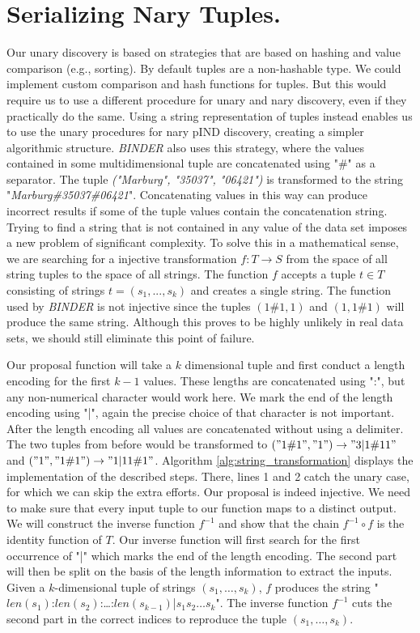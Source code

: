\section{Serializing Nary Tuples.}\label{subsec:nary-strings}
Our unary discovery is based on strategies that are based on hashing and value comparison (e.g., sorting). By default tuples are a non-hashable type. We could implement custom comparison and hash functions for tuples. But this would require us to use a different procedure for unary and nary discovery, even if they practically do the same. Using a string representation of tuples instead enables us to use the unary procedures for nary pIND discovery, creating a simpler algorithmic structure. \textit{BINDER} \cite{papenbrock2015divide} also uses this strategy, where the values contained in some multidimensional tuple are concatenated using "\#" as a separator. The tuple \textit{("Marburg", "35037", "06421")} is transformed to the string "\textit{Marburg\#35037\#06421}". Concatenating values in this way can produce incorrect results if some of the tuple values contain the concatenation string. Trying to find a string that is not contained in any value of the data set imposes a new problem of significant complexity. To solve this in a mathematical sense, we are searching for a injective transformation $f: T \rightarrow S$ from the space of all string tuples to the space of all strings. The function $f$ accepts a tuple $t \in T$ consisting of strings $t = (s_1, ..., s_k)$ and creates a single string. The function used by \textit{BINDER} is not injective since the tuples $(1\#1, 1)$ and $(1, 1\#1)$ will produce the same string. Although this proves to be highly unlikely in real data sets, we should still eliminate this point of failure.

Our proposal function will take a $k$ dimensional tuple and first conduct a length encoding for the first $k-1$ values. These lengths are concatenated using ":", but any non-numerical character would work here. We mark the end of the length encoding using "|", again the precise choice of that character is not important. After the length encoding all values are concatenated without using a delimiter. The two tuples from before would be transformed to $("1\#1", "1") \rightarrow "3|1\#11"$ and $("1", "1\#1") \rightarrow "1|11\#1"$. Algorithm \ref{alg:string_transformation} displays the implementation of the described steps. There, lines 1 and 2 catch the unary case, for which we can skip the extra efforts. Our proposal is indeed injective. We need to make sure that every input tuple to our function maps to a distinct output. We will construct the inverse function $f^{-1}$ and show that the chain $f^{-1} \circ f$ is the identity function of $T$. Our inverse function will first search for the first occurrence of "|" which marks the end of the length encoding. The second part will then be split on the basis of the length information to extract the inputs.
Given a $k$-dimensional tuple of strings $(s_1, \dots, s_k)$, $f$ produces the string "$len(s_1)$:$len(s_2)$:\dots:$len(s_{k-1})$|$s_1 s_2 \dots s_k$". The inverse function $f^{-1}$ cuts the second part in the correct indices to reproduce the tuple $(s_1, \dots, s_k)$.

